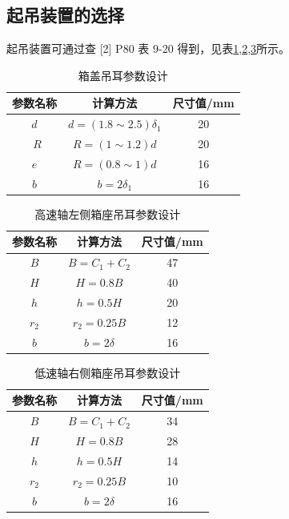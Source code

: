 \documentclass[12pt]{ctexart}
\begin{document}
\subsection{起吊装置的选择}

起吊装置可通过查 [2] P80 表 9-20 得到，见表\ref{table24},\ref{table25},\ref{table26}所示。

\begin{table}[htbp]
    \centering
    \setlength{\belowcaptionskip}{0.3cm}
    \caption{箱盖吊耳参数设计}
    \begin{tabular}{c c c}
        \toprule
        参数名称  &  计算方法  & 尺寸值/mm \\
        \midrule
        $d$   & $d=(1.8\sim 2.5)\delta_1$ & 20 \\\
        $R$    &  $R=(1\sim 1.2)d$ & 20\\
        $e$    &  $R=(0.8\sim 1)d$ & 16\\
        $b$  & $b=2\delta_1$ & 16\\ 
        \bottomrule
    \end{tabular}
    
    \label{table24}
\end{table}

\begin{table}[htbp]
    \centering

    \setlength{\belowcaptionskip}{0.3cm}
    \caption{高速轴左侧箱座吊耳参数设计}
    \begin{tabular}{c c c}
        \toprule
        参数名称  &  计算方法  & 尺寸值/mm \\
        \midrule
        $B$  & $B=C_1+C_2$ & 47\\
        $H$  & $H=0.8B$  & 40\\
        $h$  & $h=0.5 H$ & 20 \\
        $r_2$ & $r_2=0.25B$ & 12 \\
        $b$ & $b=2\delta$ & 16\\
        \bottomrule
    \end{tabular}
    
    \label{table25}
\end{table}

\begin{table}[htbp]
    \centering
    \setlength{\belowcaptionskip}{0.3cm}
    \caption{低速轴右侧箱座吊耳参数设计}
    \begin{tabular}{c c c}
        \toprule
        参数名称  &  计算方法  & 尺寸值/mm \\
        \midrule
        $B$  & $B=C_1+C_2$ & 34\\
        $H$  & $H=0.8B$  & 28\\
        $h$  & $h=0.5 H$ & 14 \\
        $r_2$ & $r_2=0.25B$ & 10 \\
        $b$ & $b=2\delta$ & 16\\
        \bottomrule
    \end{tabular}
    
    \label{table26}
\end{table}
\end{document}
